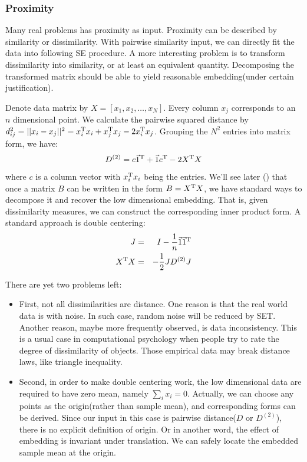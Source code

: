 \subsubsection{Proximity}
\label{sec:proximity}

Many real problems has proximity as input. Proximity 
can be described by similarity or dissimilarity. 
With pairwise similarity input, we can directly fit the 
data into following SE procedure. A more interesting 
problem is to transform dissimilarity into similarity, 
or at least an equivalent quantity. 
Decomposing the transformed matrix should be able to yield
reasonable embedding(under certain justification). 

Denote data matrix by $X = [x_1, x_2, \ldots, x_N]$. Every 
column $x_j$ corresponds to an $n$ dimensional point. We 
calculate the pairwise squared distance by 
$d^2_{ij} = ||x_i - x_j||^2 = x_i^\mathrm{T}x_i + x_j^\mathrm{T}x_j - 2x_i^\mathrm{T}x_j$. 
Grouping the $N^2$ entries into matrix form, we have:
\begin{equation}
	D^{(2)} = c\vec{1}^\mathrm{T} + \vec{1}c^\mathrm{T} - 2 X^\mathrm{T}X
\end{equation}
where $c$ is a column vector with $x_i^\mathrm{T}x_i$ being the entries. 
We'll see later (\rsec{\ref{sec:mds}}) that once a matrix $B$ can be 
written in the form $B = X^\mathrm{T}X$, we have standard ways to decompose
it and recover the low dimensional embedding. That is, given 
dissimilarity measures, we can construct the corresponding inner 
product form. A standard approach is double centering: \cite{borg2005modern}
\begin{eqnarray}
	J &=& I - \frac{1}{n} \vec{1} \vec{1}^\mathrm{T} \\
	X^\mathrm{T}X &=& -\frac{1}{2}JD^{(2)}J
\end{eqnarray}

There are yet two problems left:
\begin{itemize}
	\item First, not all dissimilarities are distance. One reason is 
		that the real world data is with noise. In such case, 
		random noise will be reduced by SET. Another reason, 
		maybe more frequently observed, is data inconsistency. 
		This is a usual case in computational psychology 
		when people try to rate the degree of dissimilarity of 
		objects\cite{borg2005modern}. Those empirical data 
		may break distance laws, like triangle inequality. 
	\item Second, in order to make double centering work, 
		the low dimensional data are required to have zero mean, 
		namely $\sum_i{x_i} = 0$. Actually, we can choose any 
		points as the origin(rather than sample mean), and 
		corresponding forms can be derived. Since our input in this case 
		is pairwise distance($D$ or $D^{(2)}$), there is no 
		explicit definition of origin. Or in another word, 
		the effect of embedding is invariant under translation. 
		We can safely locate the embedded sample mean at the origin. 
\end{itemize}

